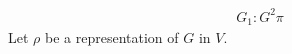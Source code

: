 \documentclass{article}
\begin{document}
\begin{eqnarray}
  \label{eq:1}
  G_1 \colon G^{2} \pi  
\end{eqnarray}
Let $\rho$ be a representation of $G$ in $V$. 
\end{document}
